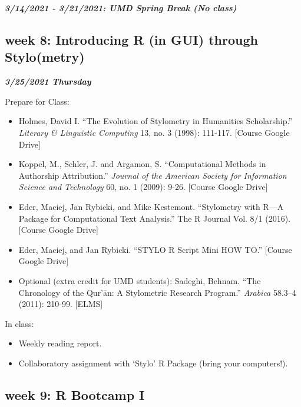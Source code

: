 \documentclass[
]{book}
\providecommand{\tightlist}{%
  \setlength{\itemsep}{0pt}\setlength{\parskip}{0pt}}
\begin{document}
\textbf{\emph{3/14/2021 - 3/21/2021: UMD Spring Break (No class)}}

\hypertarget{week-8-introducing-r-in-gui-through-stylometry}{%
\subsection{week 8: Introducing R (in GUI) through Stylo(metry)}\label{week-8-introducing-r-in-gui-through-stylometry}}

\textbf{\emph{3/25/2021 Thursday}}

Prepare for Class:

\begin{itemize}
\tightlist
\item
  Holmes, David I. ``The Evolution of Stylometry in Humanities Scholarship.'' \emph{Literary \& Linguistic Computing} 13, no. 3 (1998): 111-117. {[}Course Google Drive{]}
\item
  Koppel, M., Schler, J. and Argamon, S. ``Computational Methods in Authorship Attribution.'' \emph{Journal of the American Society for Information Science and Technology} 60, no. 1 (2009): 9-26. {[}Course Google Drive{]}
\item
  Eder, Maciej, Jan Rybicki, and Mike Kestemont. ``Stylometry with R---A Package for Computational Text Analysis.'' The R Journal Vol. 8/1 (2016). {[}Course Google Drive{]}\\
\item
  Eder, Maciej, and Jan Rybicki. ``STYLO R Script Mini HOW TO.'' {[}Course Google Drive{]}
\item
  Optional (extra credit for UMD students): Sadeghi, Behnam. ``The Chronology of the Qur'ān: A Stylometric Research Program.'' \emph{Arabica} 58.3--4 (2011): 210-99. {[}ELMS{]}
\end{itemize}

In class:

\begin{itemize}
\tightlist
\item
  Weekly reading report.
\item
  Collaboratory assignment with `Stylo' R Package (bring your computers!).
\end{itemize}

\hypertarget{week-9-r-bootcamp-i}{%
\subsection{week 9: R Bootcamp I}\label{week-9-r-bootcamp-i}}
\end{document}
